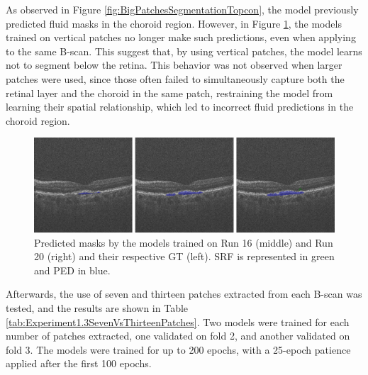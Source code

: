 \par
As observed in Figure \ref{fig:BigPatchesSegmentationTopcon}, the model previously predicted fluid masks in the choroid region. However, in Figure \ref{fig:VerticalPatchesSegmentationTopcon}, the models trained on vertical patches no longer make such predictions, even when applying to the same B-scan. This suggest that, by using vertical patches, the model learns not to segment below the retina. This behavior was not observed when larger patches were used, since those often failed to simultaneously capture both the retinal layer and the choroid in the same patch, restraining the model from learning their spatial relationship, which led to incorrect fluid predictions in the choroid region.

\begin{figure}
	\centering
	\includegraphics[width=1.0\linewidth]{figures/VerticalPatchesSegmentationTopcon.png}
	\caption{Predicted masks by the models trained on Run 16 (middle) and Run 20 (right) and their respective GT (left). SRF is represented in green and PED in blue.}
	\label{fig:VerticalPatchesSegmentationTopcon}
\end{figure}

Afterwards, the use of seven and thirteen patches extracted from each B-scan was tested, and the results are shown in Table \ref{tab:Experiment1.3SevenVsThirteenPatches}. Two models were trained for each number of patches extracted, one validated on fold 2, and another validated on fold 3. The models were trained for up to 200 epochs, with a 25-epoch patience applied after the first 100 epochs.

